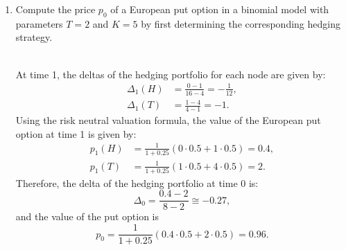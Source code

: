 \documentclass[handout,8pt]{beamer}
\begin{document}
\begin{frame}[allowframebreaks]{ }
\begin{enumerate}
\begin{enumerate}
        \item Compute the price $p_0$ of a European put option in a binomial model with parameters $T=2$ and $K=5$ by first determining the corresponding hedging strategy.
        \begin{figure}[hp]
        \end{figure}
        \\
        At time 1, the deltas of the hedging portfolio for each node are given by:
        \begin{align*}
            \Delta_1(H) &= \frac{0-1}{16-4} = - \frac{1}{12},\\
            \Delta_1(T) &= \frac{1-4}{4-1} = -1.
        \end{align*}
        Using the risk neutral valuation formula, the value of the European put option at time 1 is given by:
        \begin{align*}
            p_1(H) &= \frac{1}{1+0.25}(0\cdot 0.5 + 1\cdot 0.5) = 0.4,\\
            p_1(T) &= \frac{1}{1+0.25}(1\cdot 0.5 + 4\cdot 0.5) = 2.
        \end{align*}
        Therefore, the delta of the hedging portfolio at time 0 is:
        \begin{equation*}
            \Delta_0 = \frac{0.4-2}{8-2}\cong -0.27,
        \end{equation*}
        and the value of the put option is
        \begin{equation*}
            p_0 = \frac{1}{1+0.25}(0.4\cdot 0.5 + 2\cdot 0.5) = 0.96.
        \end{equation*}
        

\end{enumerate}
\end{enumerate}
\end{frame}
\end{document}

